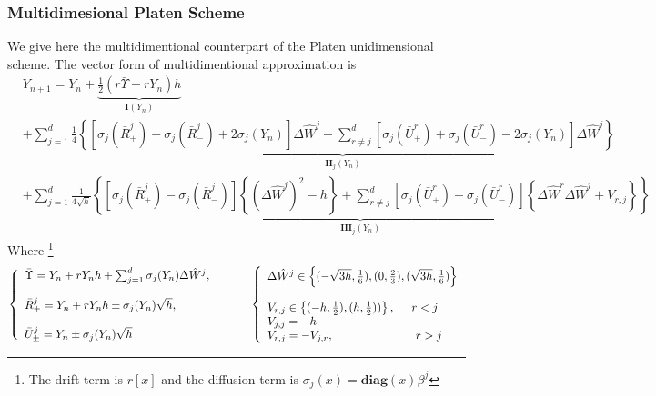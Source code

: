 \documentclass[a4paper,10pt]{article}
\begin{document}
\subsubsection{Multidimesional Platen Scheme}
We give here the multidimentional counterpart of the Platen unidimensional scheme. The vector form of multidimentional approximation is 
\begin{equation}
\begin{split}
  &Y_{n+1} = Y_{n} + 
	  \underbrace{\frac{1}{2}( r\bar{\Upsilon}  + rY_n)h}_{\textbf{I}(Y_n)} \\
         &+\sum^d_{j=1}\underbrace{\frac{1}{4}  \left\{
                           \left[  \sigma_j(\bar{R}^j_+ )  +  \sigma_j(\bar{R}^j_- )  + 2\sigma_j(Y_n)  \right]\Delta \hat{W}^j 
         +\sum^d_{r\neq j} \left[  \sigma_j(\bar{U}^r_+ )  +  \sigma_j(\bar{U}^r_- )  - 2\sigma_j(Y_n)  \right]\Delta \hat{W}^j 
                       \right\}}_{\textbf{II}_j(Y_n)}  \\
	  &+\sum^d_{j=1}\underbrace{\frac{1}{4\sqrt{h} }\left\{
			    \left[  \sigma_j(\bar{R}^j_+ )  -  \sigma_j(\bar{R}^j_- )  \right] \left\{ (\Delta \hat{W}^j)^2 - h \right\}
         +\sum^d_{r\neq j} \left[  \sigma_j(\bar{U}^r_+ )  -  \sigma_j(\bar{U}^r_- )  \right] \left\{ \Delta\hat{W}^r\Delta\hat{W}^j + V_{r,j} \right\}
                       \right\}}_{\textbf{III}_j(Y_n)}
\end{split}
\end{equation}
Where \footnote{The drift term is $r[x]$ and the diffusion term is $\sigma_j(x)=\textbf{diag}(x)\beta^j$}
\begin{equation*}
\left\lbrace
\begin{array}{l}
\bar{\Upsilon}=Y_n + rY_nh + \sum^d_{j=1} \sigma_j(Y_n) \Delta \hat{W}^j, \\ \\
\bar{R}^j_{\pm}=Y_n + rY_nh \pm \sigma_j (Y_n) \sqrt{h}, \\ \\
\bar{U}^j_{\pm}=Y_n  \pm \sigma_j (Y_n) \sqrt{h}
\end{array}
\right. \hspace{1cm}
\left\lbrace
\begin{array}{l}
\Delta \hat{W}^j \in \left\{ (-\sqrt{3h},\frac{1}{6}),(0,\frac{2}{3}),(\sqrt{3h},\frac{1}{6})   \right\} \\ \\
V_{r,j} \in  \left\{ (-h,\frac{1}{2}),(h,\frac{1}{2}))   \right\}, \hspace{0.5cm} r < j \\
V_{j,j} = -h \\
V_{r,j} = -V_{j,r} , \hspace{2.5cm} r > j
\end{array}
\right. 
\end{equation*}
\end{document}

